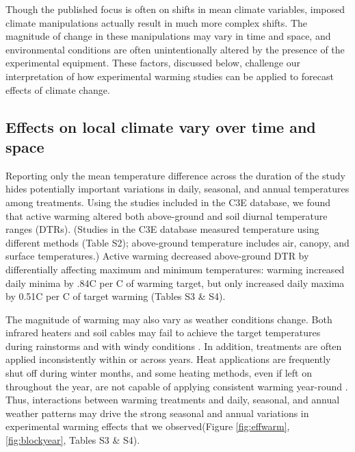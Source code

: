 \documentclass{article}
\begin{document}
\par Though the published focus is often on shifts in mean climate variables, imposed climate manipulations actually result in much more complex shifts. The magnitude of change in these manipulations may vary in time and space, and environmental conditions are often unintentionally altered by the presence of the experimental equipment. These factors, discussed below, challenge our interpretation of how experimental warming studies can be applied to forecast effects of climate change.

\subsection* {Effects on local climate vary over time and space}
Reporting only the mean temperature difference across the duration of the study hides potentially important variations in daily, seasonal, and annual temperatures among treatments. Using the studies included in the C3E database, we found that active warming altered both above-ground and soil diurnal temperature ranges (DTRs). (Studies in the C3E database measured temperature using different methods (Table S2); above-ground temperature includes air, canopy, and surface temperatures.) Active warming decreased above-ground DTR by differentially affecting maximum and minimum temperatures: warming increased daily minima by .84\degree C per \degree C of warming target, but only increased daily maxima by 0.51\degree C per \degree C of target warming (Tables S3 & S4). %

\par The magnitude of warming may also vary as weather conditions change.  Both infrared heaters and soil cables may fail to achieve the target temperatures during rainstorms \citep{peterjohn1993,hoeppner2012} and with windy conditions \citep{kimball2005,kimball2008}. In addition, treatments are often applied inconsistently within or across years. Heat applications are frequently shut off during winter months, and some heating methods, even if left on throughout the year, are not capable of applying consistent warming year-round \citep[e.g.][]{clark2014a,clark2014b,hagedorn2010}.  Thus, interactions between warming treatments and daily, seasonal, and annual weather patterns may drive the strong seasonal and annual variations in experimental warming effects that we observed(Figure \ref{fig:effwarm}, \ref{fig:blockyear}, Tables S3 & S4). 
\end{document}
